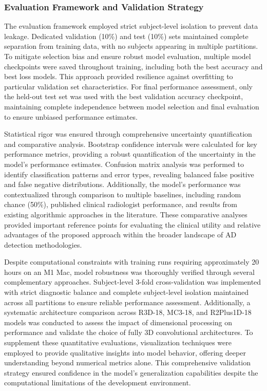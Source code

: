 \documentclass[11pt, a4paper]{article}
\begin{document}
\subsubsection{Evaluation Framework and Validation Strategy}

The evaluation framework employed strict subject-level isolation to prevent data leakage. Dedicated validation (10\%) and test (10\%) sets maintained complete separation from training data, with no subjects appearing in multiple partitions. To mitigate selection bias and ensure robust model evaluation, multiple model checkpoints were saved throughout training, including both the best accuracy and best loss models. This approach provided resilience against overfitting to particular validation set characteristics. For final performance assessment, only the held-out test set was used with the best validation accuracy checkpoint, maintaining complete independence between model selection and final evaluation to ensure unbiased performance estimates.


Statistical rigor was ensured through comprehensive uncertainty quantification and comparative analysis. Bootstrap confidence intervals were calculated for key performance metrics, providing a robust quantification of the uncertainty in the model's performance estimates. Confusion matrix analysis was performed to identify classification patterns and error types, revealing balanced false positive and false negative distributions. Additionally, the model's performance was contextualized through comparison to multiple baselines, including random chance (50\%), published clinical radiologist performance, and results from existing algorithmic approaches in the literature. These comparative analyses provided important reference points for evaluating the clinical utility and relative advantages of the proposed approach within the broader landscape of AD detection methodologies.


Despite computational constraints with training runs requiring approximately 20 hours on an M1 Mac, model robustness was thoroughly verified through several complementary approaches. Subject-level 3-fold cross-validation was implemented with strict diagnostic balance and complete subject-level isolation maintained across all partitions to ensure reliable performance assessment. Additionally, a systematic architecture comparison across R3D-18, MC3-18, and R2Plus1D-18 models was conducted to assess the impact of dimensional processing on performance and validate the choice of fully 3D convolutional architectures. To supplement these quantitative evaluations, visualization techniques were employed to provide qualitative insights into model behavior, offering deeper understanding beyond numerical metrics alone. This comprehensive validation strategy ensured confidence in the model's generalization capabilities despite the computational limitations of the development environment.
\end{document}
